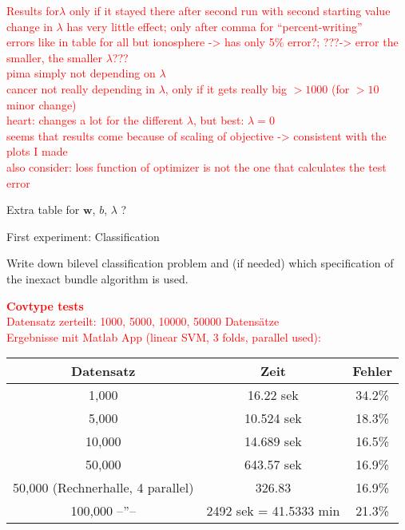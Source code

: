 \textcolor{red}{Results for\(\lambda\) only if it stayed there after second run with second starting value\\
change in \(\lambda\) has very little effect; only after comma for ``percent-writing''\\
errors like in table for all but ionosphere -> has only 5\% error?; ???-> error the smaller, the smaller \(\lambda\)???\\
pima simply not depending on \(\lambda\)\\
cancer not really depending in \(\lambda\), only if it gets really big \(>1000\) (for \(>10\) minor change)\\
heart: changes a lot for the different \(\lambda\), but best: \(\lambda=0\)\\
seems that results come because of scaling of objective -> consistent with the plots I made\\
also consider: loss function of optimizer is not the one that calculates the test error } 


Extra table for \(\bm{w}\), \(b\), \(\lambda\) ?

First experiment: Classification

Write down bilevel classification problem and (if needed) which specification of the inexact bundle algorithm is used.















\textcolor{red}{\textbf{Covtype tests}\\
Datensatz zerteilt: 1000, 5000, 10000, 50000 Datens\"atze\\
Ergebnisse mit Matlab App (linear SVM, 3 folds, parallel used):\\
\begin{tabular}{c|c|c}
Datensatz & Zeit & Fehler \\
\hline
1,000 & 16.22 sek & 34.2\% \\
5,000 & 10.524 sek & 18.3\% \\
10,000 & 14.689 sek & 16.5\% \\
50,000 &  643.57 sek & 16.9\% \\
50,000 (Rechnerhalle, 4 parallel) & 326.83 & 16.9\% \\
100,000 --''-- & 2492 sek = 41.5333 min & 21.3\%
\end{tabular}}

